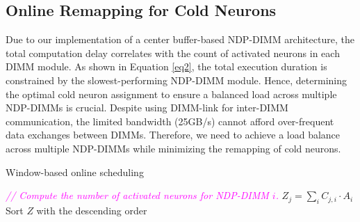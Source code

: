 \subsection{Online Remapping for Cold Neurons}\label{sec:cold-neuron-mapping}
Due to our implementation of a center buffer-based NDP-DIMM architecture, the total computation delay correlates with the count of activated neurons in each DIMM module. As shown in Equation \ref{eq2}, the total execution duration is constrained by the slowest-performing NDP-DIMM module. Hence, determining the optimal cold neuron assignment to ensure a balanced load across multiple NDP-DIMMs is crucial.
Despite using DIMM-link for inter-DIMM communication, the limited bandwidth (25GB/s) cannot afford over-frequent data exchanges between DIMMs. Therefore, we need to achieve a load balance across multiple NDP-DIMMs while minimizing the remapping of cold neurons.

\begin{algorithm}[t]
\scriptsize
    \caption{Window-based online scheduling}\label{alg:balance}



\emph{{\textcolor{magenta}{// Compute the number of activated neurons for NDP-DIMM $i$.}}}
$Z_{j} = \sum_{i} C_{j,i} \cdot A_{i}$ \\ 
Sort $Z$ with the descending order \\

\end{algorithm}


